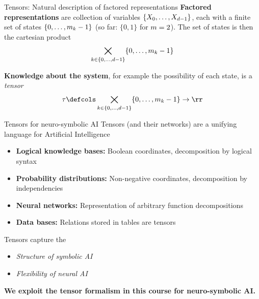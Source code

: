 \documentclass{beamer}
\begin{document}
    \begin{frame}{Tensors: Natural description of factored representations}
    {\bf Factored representations}
        are collection of variables $\{X_{0},\ldots,X_{d-1}\}$, each with a finite set of states $\{0,\ldots,m_{k}-1\}$ (so far: $\{0,1\}$ for $m=2$).
        The set of states is then the cartesian product
        \begin{align*}
            \bigtimes_{k\in\{0,\ldots,d-1\}} \{0,\ldots,m_{k}-1\}
        \end{align*}

            {\bf Knowledge about the system}, for example the possibility of each state, is a \emph{tensor}
        \begin{align*}
            \hypercore \defcols \bigtimes_{\catenumerator\in\{0,\ldots,\catorder-1\}} \{0,\ldots,\catdimof{\catenumerator}-1\} \rightarrow \rr
        \end{align*}
    \end{frame}

    \begin{frame}{Tensors for neuro-symbolic AI}
        Tensors (and their networks) are a unifying language for Artificial Intelligence
        \begin{itemize}
            \item {\bf Logical knowledge bases:} Boolean coordinates, decomposition by logical syntax
            \item {\bf Probability distributions:} Non-negative coordinates, decomposition by independencies
            \item {\bf Neural networks:} Representation of arbitrary function decompositions
            \item {\bf Data bases:} Relations stored in tables are tensors
        \end{itemize}

        Tensors capture the
        \begin{itemize}
            \item \emph{Structure of symbolic AI}
            \item \emph{Flexibility of neural AI}
        \end{itemize}

        \begin{center}
            \bf We exploit the tensor formalism in this course for neuro-symbolic AI.
        \end{center}
    \end{frame}
\end{document}
